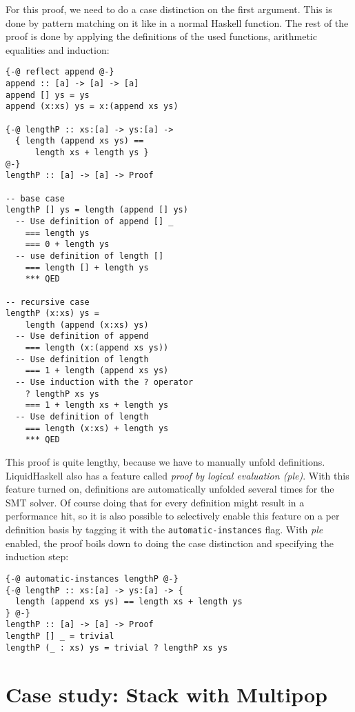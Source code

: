 \documentclass[sigplan,screen,review,anonymous]{acmart}
\begin{document}
For this proof, we need to do a case distinction on the first argument. This is done by pattern matching on it like in a normal Haskell function. The rest of the proof is done by applying the definitions of the used functions, arithmetic equalities and induction:

\begin{lstlisting}
{-@ reflect append @-}
append :: [a] -> [a] -> [a]
append [] ys = ys
append (x:xs) ys = x:(append xs ys)

{-@ lengthP :: xs:[a] -> ys:[a] ->
  { length (append xs ys) ==
      length xs + length ys }
@-}
lengthP :: [a] -> [a] -> Proof

-- base case
lengthP [] ys = length (append [] ys)
  -- Use definition of append [] _
    === length ys
    === 0 + length ys
  -- use definition of length []
    === length [] + length ys
    *** QED

-- recursive case
lengthP (x:xs) ys =
    length (append (x:xs) ys)
  -- Use definition of append
    === length (x:(append xs ys))
  -- Use definition of length
    === 1 + length (append xs ys)
  -- Use induction with the ? operator
    ? lengthP xs ys
    === 1 + length xs + length ys
  -- Use definition of length
    === length (x:xs) + length ys
    *** QED
\end{lstlisting}

This proof is quite lengthy, because we have to manually unfold definitions. LiquidHaskell also has a feature called \textit{proof by logical evaluation (ple)}. With this feature turned on, definitions are automatically unfolded several times for the SMT solver. Of course doing that for every definition might result in a performance hit, so it is also possible to selectively enable this feature on a per definition basis by tagging it with the \texttt{automatic-instances} flag. With \textit{ple} enabled, the proof boils down to doing the case distinction and specifying the induction step:

\begin{lstlisting}
{-@ automatic-instances lengthP @-}
{-@ lengthP :: xs:[a] -> ys:[a] -> {
  length (append xs ys) == length xs + length ys
} @-}
lengthP :: [a] -> [a] -> Proof
lengthP [] _ = trivial
lengthP (_ : xs) ys = trivial ? lengthP xs ys

\end{lstlisting}

\section{Case study: Stack with Multipop}\label{sec:stack}
\end{document}
